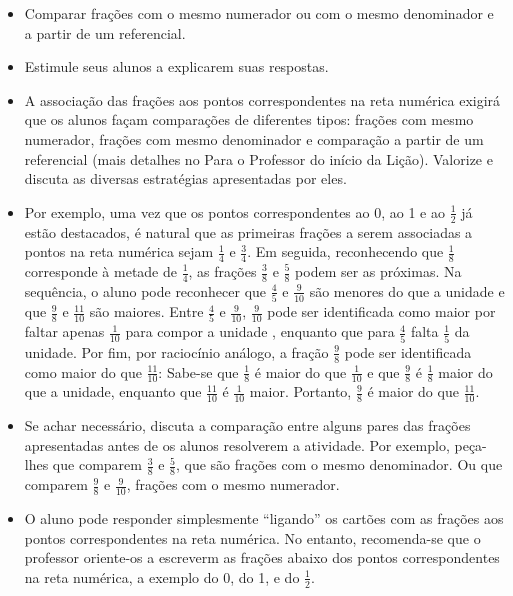 \begin{atividade}\label{chap3-ativ15}
\objetivos
\begin{itemize} %
    \item       Comparar frações com o mesmo numerador ou com o mesmo denominador e a partir de um referencial.
\end{itemize} %

\discussoes
\begin{itemize}
    \item       Estimule seus alunos a explicarem suas respostas.
    \item       A associação das frações aos pontos correspondentes na reta numérica exigirá que os alunos façam comparações de diferentes tipos: frações com mesmo numerador, frações com mesmo denominador e comparação a partir de um referencial (mais detalhes no Para o Professor do início da Lição). Valorize e discuta as diversas estratégias apresentadas por eles.
    \item       Por exemplo, uma vez que os pontos correspondentes ao 0, ao 1 e ao $\frac{1}{2}$ já estão destacados, é natural que as primeiras frações a serem associadas a pontos na reta numérica sejam       $\frac{1}{4}$       e       $\frac{3}{4}$. Em seguida, reconhecendo que       $\frac{1}{8}$       corresponde à metade de       $\frac{1}{4}$,  as frações       $\frac{3}{8}$       e       $\frac{5}{8}$       podem ser as próximas.  Na sequência, o aluno pode reconhecer que       $\frac{4}{5}$       e       $\frac{9}{10}$       são menores do que a unidade e que       $\frac{9}{8}$       e       $\frac{11}{10}$       são maiores.  Entre       $\frac{4}{5}$       e       $\frac{9}{10}$,       $\frac{9}{10}$       pode ser identificada como maior por faltar  apenas       $\frac{1}{10}$       para compor a unidade , enquanto que para       $\frac{4}{5}$       falta       $\frac{1}{5}$       da unidade. Por fim, por raciocínio análogo, a fração       $\frac{9}{8}$       pode ser identificada como maior do que       $\frac{11}{10}$: Sabe-se que $\frac{1}{8}$ é maior do que $\frac{1}{10}$ e que $\frac{9}{8}$  é  $\frac{1}{8}$       maior do que a unidade, enquanto que       $\frac{11}{10}$       é        $\frac{1}{10}$       maior. Portanto, $\frac{9}{8}$    é maior do que       $\frac{11}{10}$.
    \item       Se achar necessário, discuta a comparação entre alguns pares das frações apresentadas antes de os alunos resolverem a atividade. Por exemplo, peça-lhes que comparem       $\frac{3}{8}$        e       $\frac{5}{8}$, que são frações com o mesmo denominador. Ou que comparem       $\frac{9}{8}$       e       $\frac{9}{10}$, frações com o mesmo numerador.
    \item       O aluno pode responder simplesmente       ``ligando''       os cartões com as frações aos pontos correspondentes na reta numérica. No entanto, recomenda-se que o professor oriente-os a escreverm as frações abaixo dos pontos correspondentes na reta numérica, a exemplo do 0, do 1, e do       $\frac{1}{2}$.
\end{itemize} %


\end{atividade}
